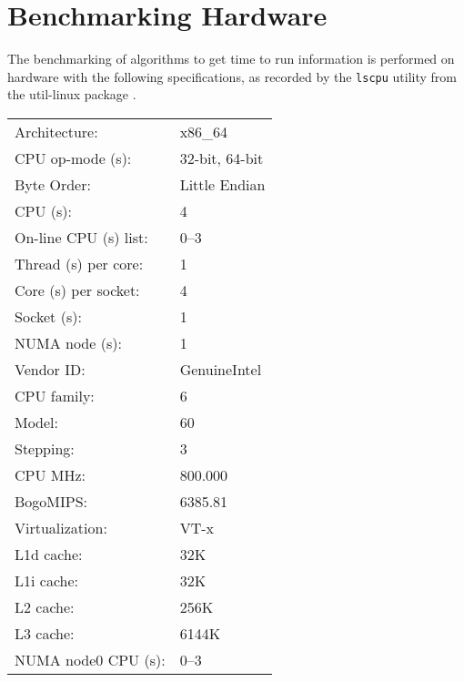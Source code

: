 
\chapter{Benchmarking Hardware}
\label{app:benchmarking_hardware}

The benchmarking of algorithms to get time to run information is performed on
hardware with the following specifications, as recorded by the \texttt{lscpu}
utility from the util-linux package \cite{lscpu}.

\begin{tabular}{l l}
	Architecture:          & x86\_64 \\
	CPU op-mode  (s):      & 32-bit, 64-bit \\
	Byte Order:            & Little Endian \\
	CPU (s):               & 4 \\
	On-line CPU (s) list:  & 0--3 \\
	Thread (s) per core:   & 1 \\
	Core (s) per socket:   & 4 \\
	Socket (s):            & 1 \\
	NUMA node (s):         & 1 \\
	Vendor ID\@:           & GenuineIntel \\
	CPU family:            & 6 \\
	Model:                 & 60 \\
	Stepping:              & 3 \\
	CPU MHz:               & 800.000 \\
	BogoMIPS\@:            & 6385.81 \\
	Virtualization:        & VT-x \\
	L1d cache:             & 32K \\
	L1i cache:             & 32K \\
	L2 cache:              & 256K \\
	L3 cache:              & 6144K \\
	NUMA node0 CPU (s):    & 0--3 \\
\end{tabular}
